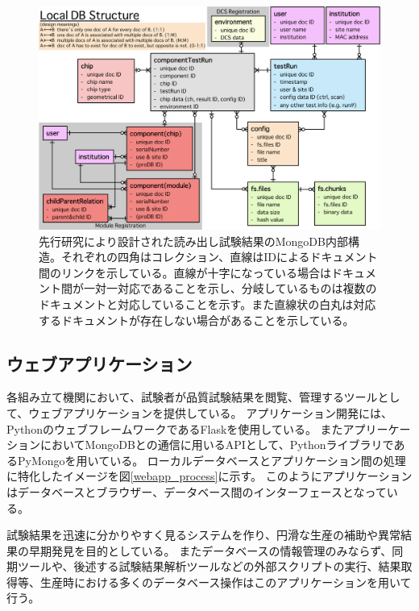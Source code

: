 \begin{figure}[bpt]\centering
\includegraphics[width=12cm]{./localdb_structure_detail.png}
\caption[先行研究により設計された読み出し試験結果のMongoDB内部構造]{先行研究により設計された読み出し試験結果のMongoDB内部構造\cite{4-6}。それぞれの四角はコレクション、直線はIDによるドキュメント間のリンクを示している。直線が十字になっている場合はドキュメント間が一対一対応であることを示し、分岐しているものは複数のドキュメントと対応していることを示す。また直線状の白丸は対応するドキュメントが存在しない場合があることを示している。}
\label{localdb_structure_detail}
\end{figure}

\clearpage
\subsection{ウェブアプリケーション} \label{sec:web_app}

各組み立て機関において、試験者が品質試験結果を閲覧、管理するツールとして、ウェブアプリケーションを提供している。
アプリケーション開発には、PythonのウェブフレームワークであるFlaskを使用している。
またアプリーケーションにおいてMongoDBとの通信に用いるAPIとして、PythonライブラリであるPyMongo\cite{4-4}を用いている。
ローカルデータベースとアプリケーション間の処理に特化したイメージを図\ref{webapp_process}に示す。
このようにアプリケーションはデータベースとブラウザー、データベース間のインターフェースとなっている。

試験結果を迅速に分かりやすく見るシステムを作り、円滑な生産の補助や異常結果の早期発見を目的としている。
またデータベースの情報管理のみならず、同期ツールや、後述する試験結果解析ツールなどの外部スクリプトの実行、結果取得等、生産時における多くのデータベース操作はこのアプリケーションを用いて行う。

